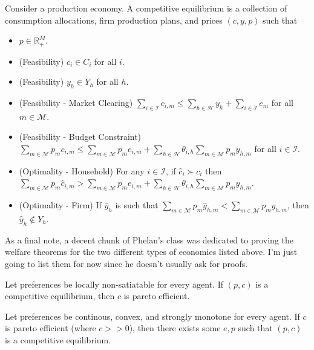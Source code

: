 \documentclass[11pt,english]{article}
\begin{document}
\begin{definition}
Consider a production economy. A competitive equilibrium is a collection of consumption allocations, firm production plans, and prices $(c,y,p)$ such that
\begin{itemize}
\item $p\in \mathbb{R}_+^M$.
\item (Feasibility) $c_i\in C_i$ for all $i$.
\item (Feasibility) $y_h\in Y_h$ for all $h$.
\item (Feasibility - Market Clearing) $\sum_{i\in \mathcal{I}}c_{i,m} \leq \sum_{h\in \mathcal{H}}y_h + \sum_{i\in \mathcal{I}}e_m$ for all $m\in \mathcal{M}$.
\item (Feasibility - Budget Constraint)  $\sum_{m\in \mathcal{M}} p_m c_{i,m} \leq \sum_{m\in \mathcal{M}} p_m e_{i,m} + \sum_{h\in \mathcal{H}} \theta_{i,h}\sum_{m\in \mathcal{M}}p_my_{h,m}$ for all $i\in \mathcal{I}$.
\item (Optimality - Household) For any $i\in \mathcal{I}$, if $\hat{c}_i \succ c_i$ then $\sum_{m\in \mathcal{M}} p_m \hat{c}_{i,m} > \sum_{m\in \mathcal{M}} p_m e_{i,m} +  \sum_{h\in \mathcal{H}} \theta_{i,h}\sum_{m\in \mathcal{M}}p_my_{h,m}$.
\item (Optimality - Firm) If $\hat{y}_h$ is such that $\sum_{m\in \mathcal{M}} p_m\hat{y}_{h,m} < \sum_{m\in \mathcal{M}} p_m y_{h,m}$, then $\hat{y}_h \notin Y_h$.
\end{itemize}
\end{definition}


As a final note, a decent chunk of Phelan's class was dedicated to proving the welfare theorems for the two different types of economies listed above. I'm just going to list them for now since he doesn't usually ask for proofs.
\begin{theorem}
Let preferences be locally non-satiatable for every agent. If $(p,c)$ is a competitive equilibrium, then $c$ is pareto efficient.
\end{theorem}

\begin{theorem}
Let preferences be continous, convex, and strongly monotone for every agent. If $c$ is pareto efficient (where $c >> 0$), then there exists some $e, p$ such that $(p,c)$ is a competitive equilibrium.
\end{theorem}
\end{document}
